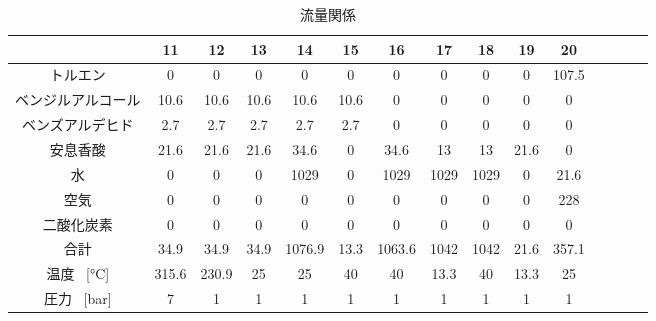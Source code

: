 \documentclass[a4j]{jsreport}
\begin{document}
\begin{table}[htbp]
    \caption{流量関係}
    \label{流量関係2}
    \begin{center}
        \begin{tabular}{ccccccccccccccc}
          \hline
          [\si{\kilo \mole \per \hour}] & 11 & 12 & 13 & 14 & 15 & 16 & 17 & 18 & 19 & 20 \\
          \hline
          トルエン & 0 & 0 & 0 & 0 & 0 & 0 & 0 & 0 & 0 & 107.5 \\
          ベンジルアルコール & 10.6 & 10.6 & 10.6 & 10.6 & 10.6 & 0 & 0 & 0 & 0 & 0 \\
          ベンズアルデヒド & 2.7 & 2.7 & 2.7 & 2.7 & 2.7 & 0 & 0 & 0 & 0 & 0 \\
          安息香酸 & 21.6 & 21.6 & 21.6 & 34.6 & 0 & 34.6 & 13 & 13 & 21.6 & 0 \\
          水 & 0 & 0 & 0 & 1029 & 0 & 1029 & 1029 & 1029 & 0 & 21.6 \\
          空気 & 0 & 0 & 0 & 0 & 0 & 0 & 0 & 0 & 0 & 228 \\
          二酸化炭素 & 0 & 0 & 0 & 0 & 0 & 0 & 0 & 0 & 0 & 0 \\
          \hline
          合計 & 34.9 & 34.9 & 34.9 & 1076.9 & 13.3 & 1063.6 & 1042 & 1042 & 21.6 & 357.1 \\
          \hline
          温度 \, [\si{\degreeCelsius}] & 315.6 & 230.9 & 25 & 25 & 40 & 40 & 13.3 & 40 & 13.3 & 25 \\
          圧力 \, [\si{\bar}] & 7 & 1 & 1 & 1 & 1 & 1 & 1 & 1 & 1 & 1 \\
          \hline
        \end{tabular}
    \end{center}
\end{table}
\end{document}
